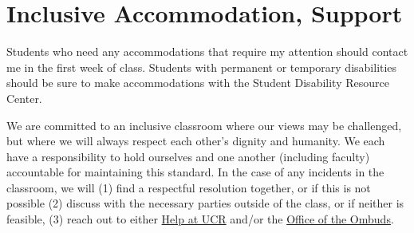 \documentclass[12pt]{article}
\numberwithin{equation}{section}    %
\begin{document}
\section*{Inclusive Accommodation, Support}

Students who need any accommodations that require my attention should contact me in the first week of class. Students with permanent or temporary disabilities should be sure to make accommodations with the Student Disability Resource Center.

We are committed to an inclusive classroom where our views may be challenged, but where we will always respect each other's dignity and humanity. We each have a responsibility to hold ourselves and one another (including faculty) accountable for maintaining this standard. In the case of any incidents in the classroom, we will (1) find a respectful resolution together, or if this is not possible (2) discuss with the necessary parties outside of the class, or if neither is feasible, (3) reach out to either \href{https://help.ucr.edu}{Help at UCR} and/or the \href{https://ombuds.ucr.edu}{Office of the Ombuds}. 
\end{document}
